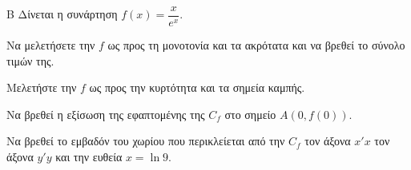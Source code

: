 \begin{thema}{Β}
Δίνεται η συνάρτηση $f(x)=\dfrac{x}{e^x}$.
\begin{erwthma}
\item Να μελετήσετε την $f$ ως προς τη μονοτονία και τα ακρότατα και να βρεθεί το σύνολο τιμών της.
\item Μελετήστε την $f$ ως προς την κυρτότητα και τα σημεία καμπής.
\item Να βρεθεί η εξίσωση της εφαπτομένης της $C_f$ στο σημείο $A(0,f(0))$.
\item Να βρεθεί το εμβαδόν του χωρίου που περικλείεται από την $C_f$ τον άξονα $x'x$ τον άξονα $y'y$ και την ευθεία $x=\ln{9}$.
\end{erwthma}
\end{thema}
